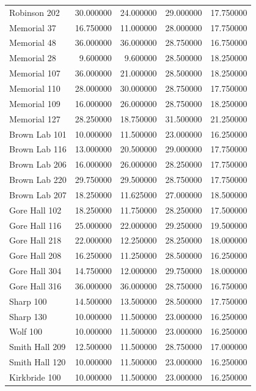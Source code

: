 \documentclass[conference]{IEEEtran}
\begin{document}
\begin{tabular}{lrrrr}
    Robinson 202 & 30.000000 & 24.000000 & 29.000000 & 17.750000 \\
    Memorial 37 & 16.750000 & 11.000000 & 28.000000 & 17.750000 \\
    Memorial 48 & 36.000000 & 36.000000 & 28.750000 & 16.750000 \\
    Memorial 28 & 9.600000 & 9.600000 & 28.500000 & 18.250000 \\
    Memorial 107 & 36.000000 & 21.000000 & 28.500000 & 18.250000 \\
    Memorial 110 & 28.000000 & 30.000000 & 28.750000 & 17.750000 \\
    Memorial 109 & 16.000000 & 26.000000 & 28.750000 & 18.250000 \\
    Memorial 127 & 28.250000 & 18.750000 & 31.500000 & 21.250000 \\
    Brown Lab 101 & 10.000000 & 11.500000 & 23.000000 & 16.250000 \\
    Brown Lab 116 & 13.000000 & 20.500000 & 29.000000 & 17.750000 \\
    Brown Lab 206 & 16.000000 & 26.000000 & 28.250000 & 17.750000 \\
    Brown Lab 220 & 29.750000 & 29.500000 & 28.750000 & 17.750000 \\
    Brown Lab 207 & 18.250000 & 11.625000 & 27.000000 & 18.500000 \\
    Gore Hall 102 & 18.250000 & 11.750000 & 28.250000 & 17.500000 \\
    Gore Hall 116 & 25.000000 & 22.000000 & 29.250000 & 19.500000 \\
    Gore Hall 218 & 22.000000 & 12.250000 & 28.250000 & 18.000000 \\
    Gore Hall 208 & 16.250000 & 11.250000 & 28.500000 & 16.250000 \\
    Gore Hall 304 & 14.750000 & 12.000000 & 29.750000 & 18.000000 \\
    Gore Hall 316 & 36.000000 & 36.000000 & 28.750000 & 16.750000 \\
    Sharp 100 & 14.500000 & 13.500000 & 28.500000 & 17.750000 \\
    Sharp 130 & 10.000000 & 11.500000 & 23.000000 & 16.250000 \\
    Wolf 100 & 10.000000 & 11.500000 & 23.000000 & 16.250000 \\
    Smith Hall 209 & 12.500000 & 11.500000 & 28.750000 & 17.000000 \\
    Smith Hall 120 & 10.000000 & 11.500000 & 23.000000 & 16.250000 \\
    Kirkbride 100 & 10.000000 & 11.500000 & 23.000000 & 16.250000 \\

\end{tabular}
\end{document}
